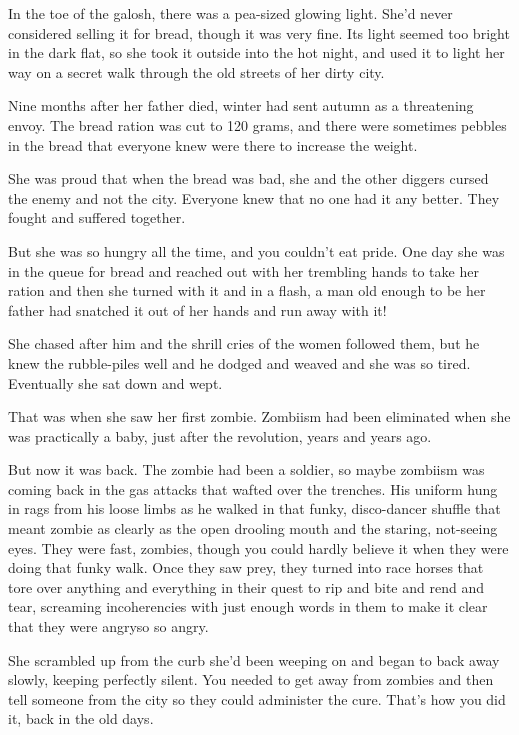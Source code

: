 In the toe of the galosh, there was a pea-sized glowing light.
She’d never considered selling it for bread, though it was very
fine. Its light seemed too bright in the dark flat, so she took it
outside into the hot night, and used it to light her way on a
secret walk through the old streets of her dirty city.

\tb

Nine months after her father died, winter had sent autumn as a
threatening envoy. The bread ration was cut to 120 grams, and there
were sometimes pebbles in the bread that everyone knew were there
to increase the weight.

She was proud that when the bread was bad, she and the other
diggers cursed the enemy and not the city. Everyone knew that no
one had it any better. They fought and suffered together.

But she was so hungry all the time, and you couldn’t eat pride. One
day she was in the queue for bread and reached out with her
trembling hands to take her ration and then she turned with it and
in a flash, a man old enough to be her father had snatched it out
of her hands and run away with it!

She chased after him and the shrill cries of the women followed
them, but he knew the rubble-piles well and he dodged and weaved
and she was so tired. Eventually she sat down and wept.

That was when she saw her first zombie. Zombiism had been
eliminated when she was practically a baby, just after the
revolution, years and years ago.

But now it was back. The zombie had been a soldier, so maybe
zombiism was coming back in the gas attacks that wafted over the
trenches. His uniform hung in rags from his loose limbs as he
walked in that funky, disco-dancer shuffle that meant zombie as
clearly as the open drooling mouth and the staring, not-seeing
eyes. They were fast, zombies, though you could hardly believe it
when they were doing that funky walk. Once they saw prey, they
turned into race horses that tore over anything and everything in
their quest to rip and bite and rend and tear, screaming
incoherencies with just enough words in them to make it clear that
they were angry\dash{}so so angry.

She scrambled up from the curb she’d been weeping on and began to
back away slowly, keeping perfectly silent. You needed to get away
from zombies and then tell someone from the city so they could
administer the cure. That’s how you did it, back in the old days.

